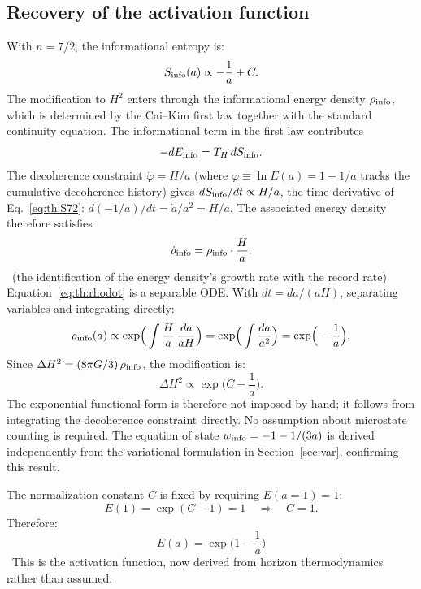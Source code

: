 \subsection{Recovery of the activation function}
With $n=7/2$, the informational entropy is:
\begin{equation}S_{\rm info}(a)\propto-\frac1a+C .\label{eq:th:S72}\end{equation}
The modification to $H^2$ enters through the informational energy density $\rho_{\rm info}$, which is determined by the Cai--Kim first law together
with the standard continuity equation. The informational term in the first law contributes
\begin{equation}-dE_{\rm info}=T_H\,dS_{\rm info}.\label{eq:th:dEinfo}\end{equation}
The decoherence constraint $\dot\varphi=H/a$ (where $\varphi\equiv\ln E(a)=1-1/a$ tracks the cumulative decoherence history) gives
$dS_{\rm info}/dt\propto H/a$, the time derivative of Eq.~\eqref{eq:th:S72}: $d(-1/a)/dt=\dot a/a^2=H/a$. The associated energy density therefore satisfies
\begin{equation}\dot\rho_{\rm info}=\rho_{\rm info}\cdot\frac Ha .\label{eq:th:rhodot}\end{equation}
\conjecture\ (the identification of the energy density's growth rate with the record rate) Equation~\eqref{eq:th:rhodot} is a separable ODE. With
$dt=da/(aH)$, separating variables and integrating directly:
\begin{equation}\rho_{\rm info}(a)\propto\exp\!\Big(\int\frac Ha\,\frac{da}{aH}\Big)=\exp\!\Big(\int\frac{da}{a^2}\Big)=\exp\!\Big(-\frac1a\Big).\label{eq:th:rhoint}\end{equation}
Since $\Delta H^2=(8\pi G/3)\,\rho_{\rm info}$, the modification is:
\begin{equation}\Delta H^2\propto\exp\!\Big(C-\frac1a\Big).\label{eq:th:dH2}\end{equation}
The exponential functional form is therefore not imposed by hand; it follows from integrating the decoherence constraint directly. No assumption about
microstate counting is required. The equation of state $w_{\rm info}=-1-1/(3a)$ is derived independently from the variational formulation in
Section~\ref{sec:var}, confirming this result.

The normalization constant $C$ is fixed by requiring $E(a{=}1)=1$:
\begin{equation}E(1)=\exp(C-1)=1\quad\Longrightarrow\quad C=1 .\label{eq:th:C}\end{equation}
Therefore:
\begin{equation}\boxed{E(a)=\exp\!\Big(1-\frac1a\Big)}\label{part2:eq:Ea}\end{equation}
\derived\ This is the activation function, now derived from horizon thermodynamics rather than assumed.

